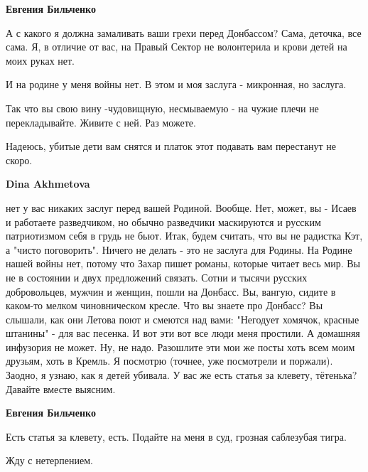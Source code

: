 \begin{itemize}
\begin{itemize}
\textbf{Евгения Бильченко} 

А с какого я должна замаливать ваши грехи перед Донбассом? Сама, деточка, все
сама. Я, в отличие от вас, на Правый Сектор не волонтерила и крови детей на
моих руках нет.

И на родине у меня войны нет. В этом и моя заслуга - микронная, но заслуга.

Так что вы свою вину -чудовищную, несмываемую - на чужие плечи не
перекладывайте. Живите с ней. Раз можете.

Надеюсь, убитые дети вам снятся и платок этот подавать вам перестанут не скоро.


 
\textbf{Dina Akhmetova} 

нет у вас никаких заслуг перед вашей Родиной. Вообще.
Нет, может, вы - Исаев и работаете разведчиком, но обычно разведчики
маскируются и русским патриотизмом себя в грудь не бьют. Итак, будем считать,
что вы не радистка Кэт, а "чисто поговорить". Ничего не делать - это не заслуга
для Родины. На Родине нашей войны нет, потому что Захар пишет романы, которые
читает весь мир. Вы не в состоянии и двух предложений связать. Сотни и тысячи
русских добровольцев, мужчин и женщин, пошли на Донбасс. Вы, вангую, сидите в
каком-то мелком чиновническом кресле. Что вы знаете про Донбасс? Вы слышали,
как они Летова поют и смеются над вами: "Негодует хомячок, красные штанины" -
для вас песенка. И вот эти вот все люди меня простили. А домашняя инфузория не
может. Ну, не надо. Разошлите эти мои же посты хоть всем моим друзьям, хоть в
Кремль. Я посмотрю (точнее, уже посмотрели и поржали). Заодно, я узнаю, как я
детей убивала. У вас же есть статья за клевету, тётенька? Давайте вместе
выясним.

 
\textbf{Евгения Бильченко} 

Есть статья за клевету, есть. Подайте на меня в суд, грозная саблезубая тигра.

Жду с нетерпением.


\end{itemize}
\end{itemize}

